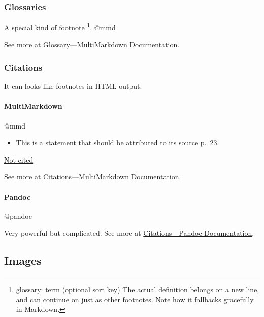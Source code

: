 \documentclass[]{article}
\providecommand{\tightlist}{%
  \setlength{\itemsep}{0pt}\setlength{\parskip}{0pt}}
\let\oldparagraph\paragraph
\renewcommand{\paragraph}[1]{\oldparagraph{#1}\mbox{}}
\begin{document}
\subsubsection{Glossaries}\label{glossaries}

A special kind of footnote \footnote{glossary: term (optional sort key)
  The actual definition belongs on a new line, and can continue on just
  as other footnotes. Note how it fallbacks gracefully in Markdown.}.
@mmd

See more at
\href{http://fletcher.github.io/MultiMarkdown-5/glossary.html}{Glossary---MultiMarkdown
Documentation}.

\subsubsection{Citations}\label{citations}

It can looks like footnotes in HTML output.

\paragraph{MultiMarkdown}\label{multimarkdown}

@mmd

\begin{itemize}
\tightlist
\item
  This is a statement that should be attributed to its source
  \href{John\%20Doe.\%20*Some\%20Big\%20Fancy\%20Book*.\%20Vanity\%20Press,\%202006.}{p.~23}.
\end{itemize}

\href{John\%20Doe.\%20*Another\%20Big\%20Fancy\%20Book*.\%20Vanity\%20Press,\%202016.}{Not
cited}

See more at
\href{http://fletcher.github.io/MultiMarkdown-5/citations.html}{Citations---MultiMarkdown
Documentation}.

\paragraph{Pandoc}\label{pandoc}

@pandoc

Very powerful but complicated. See more at
\href{http://pandoc.org/README.html\#citations}{Citations---Pandoc
Documentation}.

\subsection{Images}\label{images}
\end{document}
